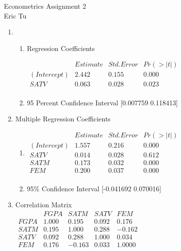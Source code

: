 \documentclass{article}
\begin{document}
\begin{center}
Econometrics Assignment 2 \\
Eric Tu
\end{center}

\begin{flushleft}

\begin{enumerate}[label=(\alph*)]
	\item

	\begin{enumerate}[label=(\roman*)]
		\item Regression Coefficients \\
		\smallskip

		$\begin{matrix}
      	     		& Estimate &Std. Error & Pr(>|t|) \\
		(Intercept)    &2.442      &0.155   &0.000 \\
		SATV           &0.063      &0.028   & 0.023 \\
		\end{matrix}$

		\item		95 Percent Confidence Interval [0.007759 0.118413]
	\end{enumerate}
	\bigskip
	\item Multiple Regression Coefficients \\
	\smallskip
	
	\begin{enumerate}[label=(\roman*)]
		\item
		$\begin{matrix}
           		& Estimate &Std. Error &Pr(>|t|) \\
		(Intercept)& 1.557   &0.216 &0.000\\
		SATV       & 0.014   &0.028 &0.612\\
		SATM      &  0.173   &0.032 &0.000\\
		FEM         &0.200   &0.037& 0.000\\
		\end{matrix}$

		\item
		95\% Confidence Interval [-0.041692  0.070016]

	\end{enumerate}
	
	\bigskip
	\item
	Correlation Matrix \\
	\smallskip
	$\begin{matrix}
		       &  FGPA   &   SATM    & SATV     &  FEM \\
	FGPA& 1.000&  0.195& 0.092  &0.176 \\
	SATM& 0.195  &1.000 &0.288 &-0.162 \\
	SATV& 0.092 & 0.288& 1.000 & 0.034 \\
	FEM  &0.176 &-0.163 &0.033  &1.0000\\
	\end{matrix}$
	

\end{enumerate}
\end{flushleft}
\end{document}
